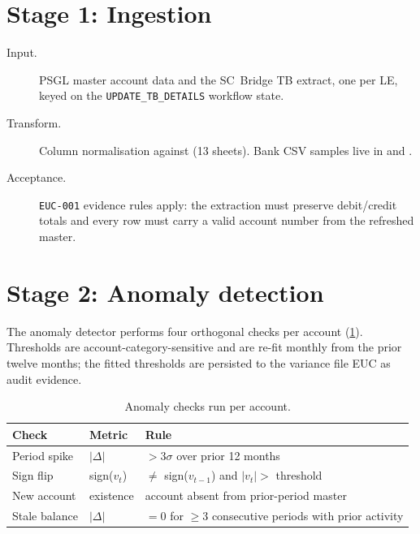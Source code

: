 \section{Stage 1: Ingestion}

\begin{description}
  \item[Input.] PSGL master account data and the SC~Bridge TB
        extract, one per LE, keyed on the \texttt{UPDATE\_TB\_DETAILS}
        workflow state.
  \item[Transform.] Column normalisation against
        (13 sheets). Bank CSV samples live in
         and
        .
  \item[Acceptance.] \texttt{EUC-001} evidence rules apply: the
        extraction must preserve debit/credit totals and every row
        must carry a valid account number from the refreshed master.
\end{description}

\section{Stage 2: Anomaly detection}

The anomaly detector performs four orthogonal checks per account
(\cref{tab:anomalies}). Thresholds are account-category-sensitive and
are re-fit monthly from the prior twelve months; the fitted thresholds
are persisted to the variance file EUC as audit evidence.

\begin{table}[htbp]
\caption{Anomaly checks run per account.}\label{tab:anomalies}
\centering
\small
\begin{tabularx}{\linewidth}{@{}llX@{}}
\toprule
\textbf{Check} & \textbf{Metric} & \textbf{Rule} \\ \midrule
Period spike   & $|\Delta|$       & $> 3\sigma$ over prior 12 months \\
Sign flip       & sign($v_t$)       & $\neq$ sign($v_{t-1}$) and $|v_t| > $ threshold \\
New account     & existence         & account absent from prior-period master \\
Stale balance   & $|\Delta|$        & $= 0$ for $\ge 3$ consecutive periods with prior activity \\
\bottomrule
\end{tabularx}
\end{table}

